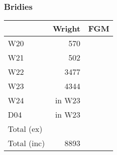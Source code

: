 \subsubsection{Bridies}
\begin{tabular}{|l|r|r|}
\hline
&Wright & FGM 
\\ \hline
W20 &570          
\\ \hline
W21 &502          
\\ \hline
W22 &3477          
\\ \hline
W23 &4344          
\\ \hline
W24 & in W23        
\\ \hline
D04 & in W23          
\\ \hline
Total (ex)        \\ \hline
Total (inc)  & 8893      \\ \hline
\end{tabular}
